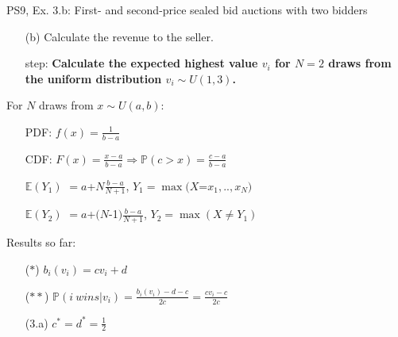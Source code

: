 \begin{frame}{PS9, Ex. 3.b: First- and second-price sealed bid auctions with two bidders}
    \begin{multicols}{2}
      \begin{itemize}
        \item[(b)] Calculate the revenue to the seller.
        \item[\nth{1} step:] \textbf{Calculate the expected highest value $v_i$ for $N=2$ draws from the uniform distribution $v_i\sim U(1,3)$.}
      \end{itemize}
      \vfill\null\columnbreak
      For $N$ draws from $x\sim U(a, b):$
      \vspace{-6pt}
      \begin{enumerate}
        \item[PDF:] $f(x)=\frac{1}{b-a}$
        \item[CDF:] $F(x)=\frac{x-a}{b-a}\Rightarrow\mathbb{P}(c>x)=\frac{c-a}{b-a}$
        \item[$\mathbb{E}(Y_1)$] $=a$+$N\frac{b-a}{N+1}$, $Y_1=\max(X$=$x_1,..,x_N)$
        \item[$\mathbb{E}(Y_2)$] $=a$+$(N$-1$)\frac{b-a}{N+1}$, $Y_2=\max(X\neq Y_1)$
      \end{enumerate}
      \vspace{-6pt}
      Results so far:
      \vspace{-6pt}
      \begin{itemize}
        \item[($*$)]  $b_i(v_i) = cv_i+d$
        \item[($**$)] $\mathbb{P}(i\ wins|v_i)=\frac{b_i(v_i)-d-c}{2c}=\frac{cv_i-c}{2c}$
        \item[(3.a)]    $c^*=d^*=\frac{1}{2}$
      \end{itemize}
      \vfill\null
    \end{multicols}
\end{frame}
